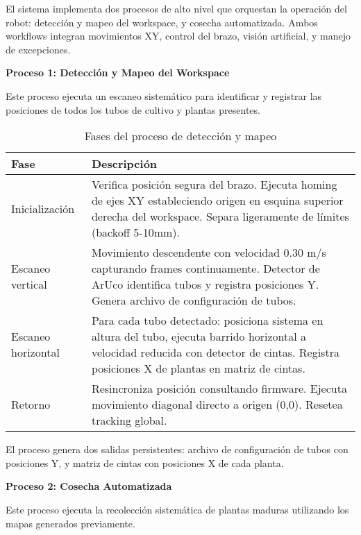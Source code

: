 El sistema implementa dos procesos de alto nivel que orquestan la operación del robot: detección y mapeo del workspace, y cosecha automatizada. Ambos workflows integran movimientos XY, control del brazo, visión artificial, y manejo de excepciones.

\textbf{Proceso 1: Detección y Mapeo del Workspace}

Este proceso ejecuta un escaneo sistemático para identificar y registrar las posiciones de todos los tubos de cultivo y plantas presentes.

\begin{table}[H]
\centering
\small
\begin{tabular}{|l|p{11cm}|}
\hline
\textbf{Fase} & \textbf{Descripción} \\
\hline
Inicialización & Verifica posición segura del brazo. Ejecuta homing de ejes XY estableciendo origen en esquina superior derecha del workspace. Separa ligeramente de límites (backoff 5-10mm). \\
\hline
Escaneo vertical & Movimiento descendente con velocidad 0.30 m/s capturando frames continuamente. Detector de ArUco identifica tubos y registra posiciones Y. Genera archivo de configuración de tubos. \\
\hline
Escaneo horizontal & Para cada tubo detectado: posiciona sistema en altura del tubo, ejecuta barrido horizontal a velocidad  reducida con detector de cintas. Registra posiciones X de plantas en matriz de cintas. \\
\hline
Retorno & Resincroniza posición consultando firmware. Ejecuta movimiento diagonal directo a origen (0,0). Resetea tracking global. \\
\hline
\end{tabular}
\caption{Fases del proceso de detección y mapeo}
\label{tab:proceso_deteccion}
\end{table}

El proceso genera dos salidas persistentes: archivo de configuración de tubos con posiciones Y, y matriz de cintas con posiciones X de cada planta.

\textbf{Proceso 2: Cosecha Automatizada}

Este proceso ejecuta la recolección sistemática de plantas maduras utilizando los mapas generados previamente.

